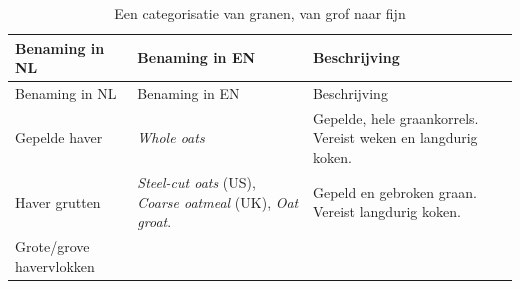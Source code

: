 \documentclass[
  11pt,
  dutch,
]{memoir}
\begin{document}
\begin{longtable}[]{@{}lll@{}}
\caption{Een categorisatie van granen, van grof naar fijn
\label{havercat}}\tabularnewline
\toprule
\begin{minipage}[b]{0.30\columnwidth}\raggedright
Benaming in NL\strut
\end{minipage} & \begin{minipage}[b]{0.24\columnwidth}\raggedright
Benaming in EN\strut
\end{minipage} & \begin{minipage}[b]{0.37\columnwidth}\raggedright
Beschrijving\strut
\end{minipage}\tabularnewline
\midrule
\endfirsthead
\toprule
\begin{minipage}[b]{0.30\columnwidth}\raggedright
Benaming in NL\strut
\end{minipage} & \begin{minipage}[b]{0.24\columnwidth}\raggedright
Benaming in EN\strut
\end{minipage} & \begin{minipage}[b]{0.37\columnwidth}\raggedright
Beschrijving\strut
\end{minipage}\tabularnewline
\midrule
\endhead
\begin{minipage}[t]{0.30\columnwidth}\raggedright
Gepelde haver\strut
\end{minipage} & \begin{minipage}[t]{0.24\columnwidth}\raggedright
\emph{Whole oats}\strut
\end{minipage} & \begin{minipage}[t]{0.37\columnwidth}\raggedright
Gepelde, hele graankorrels. Vereist weken en langdurig koken.\strut
\end{minipage}\tabularnewline
\begin{minipage}[t]{0.30\columnwidth}\raggedright
Haver grutten\strut
\end{minipage} & \begin{minipage}[t]{0.24\columnwidth}\raggedright
\emph{Steel-cut oats} (US), \emph{Coarse oatmeal} (UK), \emph{Oat
groat}.\strut
\end{minipage} & \begin{minipage}[t]{0.37\columnwidth}\raggedright
Gepeld en gebroken graan. Vereist langdurig koken.\strut
\end{minipage}\tabularnewline
\begin{minipage}[t]{0.30\columnwidth}\raggedright
Grote/grove havervlokken\strut
\end{minipage} & \begin{minipage}[t]{0.24\columnwidth}\raggedright

\end{minipage}
\end{longtable}
\end{document}
